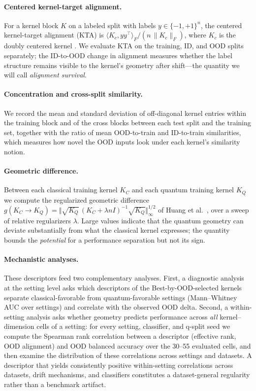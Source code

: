 \documentclass[journal]{IEEEtran}
\begin{document}
\paragraph{Centered kernel-target alignment.}
For a kernel block $K$ on a labeled split with labels $y \in \{-1,+1\}^n$, the centered kernel-target alignment (KTA) is $\langle K_c, yy^\top\rangle_F / (n\,\|K_c\|_F)$, where $K_c$ is the doubly centered kernel \cite{cristianini2001kta,cortes2012centeredalignment}. We evaluate KTA on the training, ID, and OOD splits separately; the ID-to-OOD change in alignment measures whether the label structure remains visible to the kernel's geometry after shift---the quantity we will call \emph{alignment survival}.

\paragraph{Concentration and cross-split similarity.}
We record the mean and standard deviation of off-diagonal kernel entries within the training block and of the cross blocks between each test split and the training set, together with the ratio of mean OOD-to-train and ID-to-train similarities, which measures how novel the OOD inputs look under each kernel's similarity notion.

\paragraph{Geometric difference.}
Between each classical training kernel $K_C$ and each quantum training kernel $K_Q$ we compute the regularized geometric difference $g(K_C \rightarrow K_Q) = \Vert \sqrt{K_Q}\,(K_C + \lambda n I)^{-1} \sqrt{K_Q} \Vert_\infty^{1/2}$ of Huang et al.\ \cite{huang2021powerofdata}, over a sweep of relative regularizers $\lambda$. Large values indicate that the quantum geometry can deviate substantially from what the classical kernel expresses; the quantity bounds the \emph{potential} for a performance separation but not its sign.

\paragraph{Mechanistic analyses.}
These descriptors feed two complementary analyses. First, a diagnostic analysis at the setting level asks which descriptors of the Best-by-OOD-selected kernels separate classical-favorable from quantum-favorable settings (Mann--Whitney AUC over settings) and correlate with the observed OOD delta. Second, a within-setting analysis asks whether geometry predicts performance across \emph{all} kernel--dimension cells of a setting: for every setting, classifier, and q-split seed we compute the Spearman rank correlation between a descriptor (effective rank, OOD alignment) and OOD balanced accuracy over the 30--55 evaluated cells, and then examine the distribution of these correlations across settings and datasets. A descriptor that yields consistently positive within-setting correlations across datasets, drift mechanisms, and classifiers constitutes a dataset-general regularity rather than a benchmark artifact.
\end{document}
